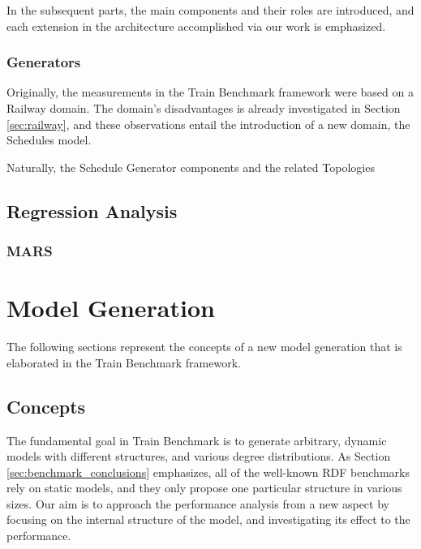In the subsequent parts, the main components and their roles are introduced, and each extension in the architecture accomplished via our work is emphasized.

\subsubsection{Generators}
Originally, the measurements in the Train Benchmark framework were based on a \textsf{Railway} domain. The domain's disadvantages is already investigated in Section \ref{sec:railway}, and these observations entail the introduction of a new domain, the \textsf{Schedules} model.

Naturally, the \textsf{Schedule Generator} components and the related \textsf{Topologies}
\subsubsection{}
\subsubsection{}


\subsection{Regression Analysis}

\subsubsection{MARS}


\section{Model Generation} 

The following sections represent the concepts of a new model generation that is elaborated in the Train Benchmark framework.
\subsection{Concepts}
The fundamental goal in Train Benchmark is to generate arbitrary, dynamic models with different structures, and various degree distributions. As Section \ref{sec:benchmark_conclusions} emphasizes, all of the well-known RDF benchmarks rely on static models, and they only propose one particular structure in various sizes. Our aim is to approach the performance analysis from a new aspect by focusing on the internal structure of the model, and investigating its effect to the performance.

